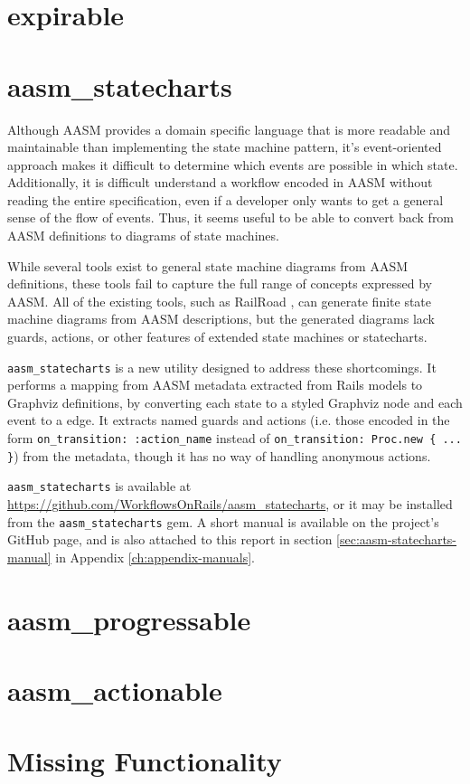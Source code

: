 \documentclass[document.tex]{subfiles}
\begin{document}
\FloatBarrier


\section {expirable}


\section {aasm\_statecharts}

Although AASM provides a domain specific language that is more readable and maintainable than implementing the state machine pattern, it's event-oriented approach makes it difficult to determine which events are possible in which state. Additionally, it is difficult understand a workflow encoded in AASM without reading the entire specification, even if a developer only wants to get a general sense of the flow of events. Thus, it seems useful to be able to convert back from AASM definitions to diagrams of state machines.

While several tools exist to general state machine diagrams from AASM definitions, these tools fail to capture the full range of concepts expressed by AASM. All of the existing tools, such as RailRoad \cite{railroad}, can generate finite state machine diagrams from AASM descriptions, but the generated diagrams lack guards, actions, or other features of extended state machines or statecharts.

\verb!aasm_statecharts! is a new utility designed to address these shortcomings. It performs a mapping from AASM metadata extracted from Rails models to Graphviz \cite{graphviz} definitions, by converting each state to a styled Graphviz node and each event to a edge. It extracts named guards and actions (i.e. those encoded in the form \verb!on_transition: :action_name! instead of \verb!on_transition: Proc.new { ... }!) from the metadata, though it has no way of handling anonymous actions.


\verb!aasm_statecharts! is available at \url{https://github.com/WorkflowsOnRails/aasm_statecharts}, or it may be installed from the \verb!aasm_statecharts! gem.
A short manual is available on the project's GitHub page, and is also attached to this report in section \ref{sec:aasm-statecharts-manual} in Appendix \ref{ch:appendix-manuals}.


\section {aasm\_progressable}


\section {aasm\_actionable}


\section {Missing Functionality}
\end{document}
